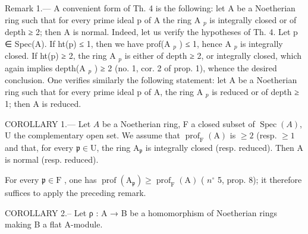 Remark 1.--- A convenient form of Th. 4 is the following: let A be a Noetherian ring such that for every prime ideal p of A the ring A \(_{p}\) is integrally closed or of depth ≥ 2; then A is normal. Indeed, let us verify the hypotheses of Th. 4. Let p ∈ Spec(A). If ht(p) ≤ 1, then we have prof(A \(_{p}\) ) ≤ 1, hence A \(_{p}\) is integrally closed. If ht(p) ≥ 2, the ring A \(_{p}\) is either of depth ≥ 2, or integrally closed, which again implies depth(A \(_{p}\) ) ≥ 2 (no. 1, cor. 2 of prop. 1), whence the desired conclusion. One verifies similarly the following statement: let A be a Noetherian ring such that for every prime ideal p of A, the ring A \(_{p}\) is reduced or of depth ≥ 1; then A is reduced.

COROLLARY 1.--- Let \(A\) be a Noetherian ring, F a closed subset of \(\operatorname{Spec}(A)\), U the complementary open set. We assume that \(\operatorname{prof}_{\mathrm{F}}(\mathrm{A})\) is \(\geqslant 2\) (resp. \(\geqslant 1\) and that, for every \(\mathfrak{p} \in \mathrm{U}\), the ring \(\mathrm{A}_{\mathfrak{p}}\) is integrally closed (resp. reduced). Then A is normal (resp. reduced).

For every \(\mathfrak{p} \in \mathrm{F}\) , one has \(\operatorname{prof}(\mathrm{A}_{\mathfrak{p}}) \geqslant \operatorname{prof}_{\mathrm{F}}(\mathrm{A})\) ( \(n^{\circ}\) 5, prop. 8); it therefore suffices to apply the preceding remark.

COROLLARY 2.-- Let ρ : A → B be a homomorphism of Noetherian rings making B a flat A-module.

